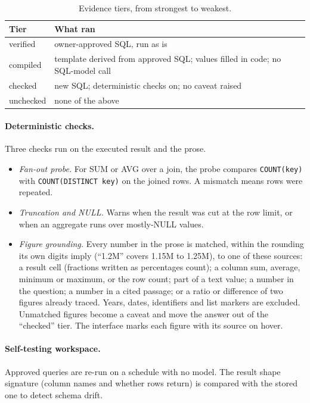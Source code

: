\documentclass[10pt,twocolumn]{article}
\begin{document}
\begin{table}[t]
\centering\small
\caption{Evidence tiers, from strongest to weakest.}\label{tab:tiers}
\begin{tabular}{@{}lp{5.4cm}@{}}
\toprule
Tier & What ran \\
\midrule
verified & owner-approved SQL, run as is \\
compiled & template derived from approved SQL; values filled in code; no SQL-model call \\
checked & new SQL; deterministic checks on; no caveat raised \\
unchecked & none of the above \\
\bottomrule
\end{tabular}
\end{table}

\paragraph{Deterministic checks.} Three checks run on the executed result and the prose.
\begin{itemize}
\item \emph{Fan-out probe.} For SUM or AVG over a join, the probe compares \texttt{COUNT(key)} with \texttt{COUNT(DISTINCT key)} on the joined rows. A mismatch means rows were repeated.
\item \emph{Truncation and NULL.} Warns when the result was cut at the row limit, or when an aggregate runs over mostly-NULL values.
\item \emph{Figure grounding.} Every number in the prose is matched, within the rounding its own digits imply (``1.2M'' covers 1.15M to 1.25M), to one of these sources: a result cell (fractions written as percentages count); a column sum, average, minimum or maximum, or the row count; part of a text value; a number in the question; a number in a cited passage; or a ratio or difference of two figures already traced. Years, dates, identifiers and list markers are excluded. Unmatched figures become a caveat and move the answer out of the ``checked'' tier. The interface marks each figure with its source on hover.
\end{itemize}

\paragraph{Self-testing workspace.} Approved queries are re-run on a schedule with no model. The result shape signature (column names and whether rows return) is compared with the stored one to detect schema drift.
\end{document}
